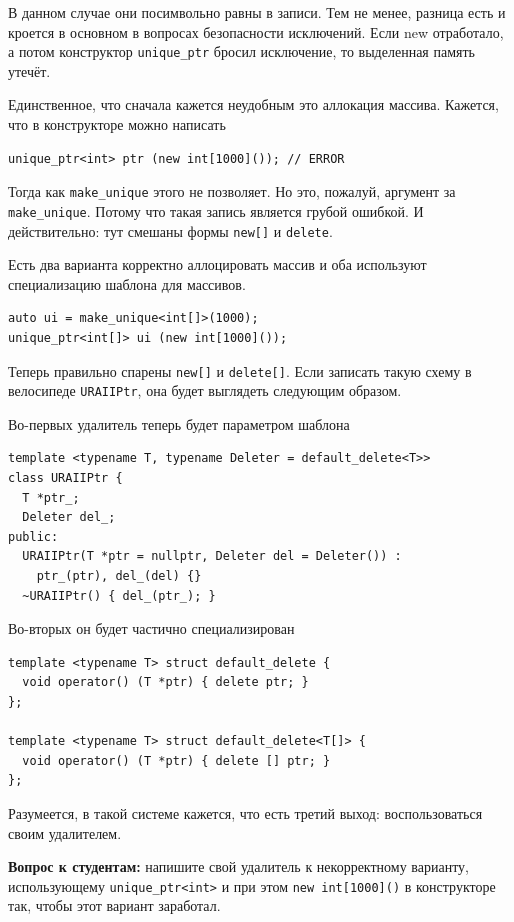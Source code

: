\documentclass[a4paper,12pt,oneside]{article}
\begin{document}
В данном случае они посимвольно равны в записи. Тем не менее, разница есть и кроется в основном в вопросах безопасности исключений. Если new отработало, а потом конструктор \lstinline!unique_ptr! бросил исключение, то выделенная память утечёт.

Единственное, что сначала кажется неудобным это аллокация массива. Кажется, что в конструкторе можно написать

\begin{lstlisting}
unique_ptr<int> ptr (new int[1000]()); // ERROR
\end{lstlisting}

Тогда как \lstinline!make_unique! этого не позволяет. Но это, пожалуй, аргумент за \lstinline!make_unique!. Потому что такая запись является грубой ошибкой. И действительно: тут смешаны формы \lstinline!new[]! и \lstinline!delete!.

Есть два варианта корректно аллоцировать массив и оба используют специализацию шаблона для массивов.

\begin{lstlisting}
auto ui = make_unique<int[]>(1000);
unique_ptr<int[]> ui (new int[1000]());
\end{lstlisting}

Теперь правильно спарены \lstinline!new[]! и \lstinline!delete[]!. Если записать такую схему в велосипеде \lstinline!URAIIPtr!, она будет выглядеть следующим образом.

Во-первых удалитель теперь будет параметром шаблона

\begin{lstlisting}
template <typename T, typename Deleter = default_delete<T>> 
class URAIIPtr {
  T *ptr_;
  Deleter del_;
public:
  URAIIPtr(T *ptr = nullptr, Deleter del = Deleter()) :
    ptr_(ptr), del_(del) {}
  ~URAIIPtr() { del_(ptr_); }
\end{lstlisting}

Во-вторых он будет частично специализирован

\begin{lstlisting}
template <typename T> struct default_delete {
  void operator() (T *ptr) { delete ptr; }
};

template <typename T> struct default_delete<T[]> {
  void operator() (T *ptr) { delete [] ptr; }
};
\end{lstlisting}

Разумеется, в такой системе кажется, что есть третий выход: воспользоваться своим удалителем.

\textbf{Вопрос к студентам:} напишите свой удалитель к некорректному варианту, использующему \lstinline!unique_ptr<int>! и при этом \lstinline!new int[1000]()! в конструкторе так, чтобы этот вариант заработал.
\end{document}
